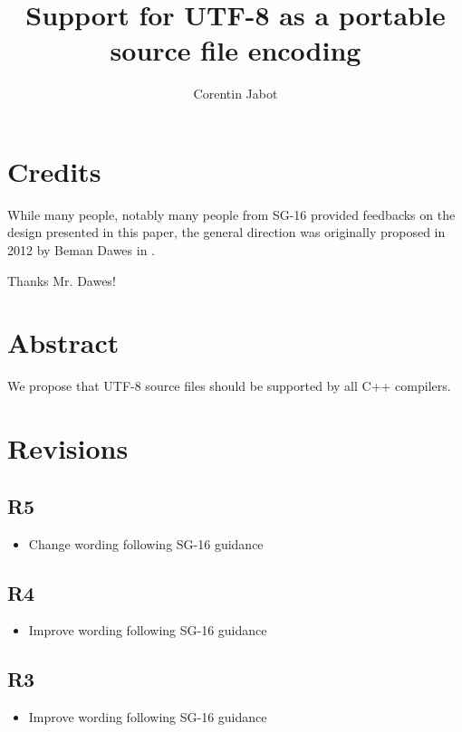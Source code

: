 \documentclass{wg21}
\title{Support for UTF-8 as a portable source file encoding}
\author{Corentin Jabot}{corentin.jabot@gmail.com}
\begin{document}
    
\maketitle


\section{Credits}

While many people, notably many people from SG-16 provided feedbacks on the design presented in this paper,
the general direction was originally proposed in 2012 by Beman Dawes in .

Thanks Mr. Dawes!

\section{Abstract}

We propose that UTF-8 source files should be supported by all C++ compilers.

\section{Revisions}


\subsection{R5}
\begin{itemize}
    \item Change wording following SG-16 guidance
\end{itemize}

\subsection{R4}
\begin{itemize}
    \item Improve wording following SG-16 guidance
\end{itemize}

\subsection{R3}
\begin{itemize}
\item Improve wording following SG-16 guidance
\end{itemize}
\end{document}
